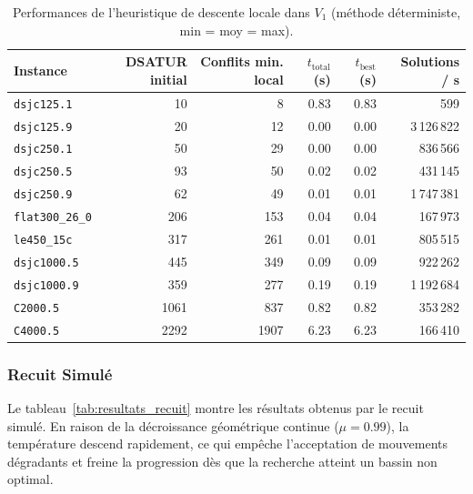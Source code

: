 \documentclass{article}
\begin{document}
\begin{table}[H]
\centering
\small
\setlength{\tabcolsep}{5pt}
\begin{tabular}{lrrrrr}
\toprule
\textbf{Instance} & \textbf{DSATUR initial} & \textbf{Conflits min. local} & \textbf{$t_{\text{total}}$ (s)} & \textbf{$t_{\text{best}}$ (s)} & \textbf{Solutions / s} \\
\midrule
\texttt{dsjc125.1}      & 10   & 8    & 0.83 & 0.83 & 599 \\
\texttt{dsjc125.9}      & 20   & 12   & 0.00 & 0.00 & 3\,126\,822 \\
\texttt{dsjc250.1}      & 50   & 29   & 0.00 & 0.00 & 836\,566 \\
\texttt{dsjc250.5}      & 93   & 50   & 0.02 & 0.02 & 431\,145 \\
\texttt{dsjc250.9}      & 62   & 49   & 0.01 & 0.01 & 1\,747\,381 \\
\texttt{flat300\_26\_0} & 206  & 153  & 0.04 & 0.04 & 167\,973 \\
\texttt{le450\_15c}     & 317  & 261  & 0.01 & 0.01 & 805\,515 \\
\texttt{dsjc1000.5}     & 445  & 349  & 0.09 & 0.09 & 922\,262 \\
\texttt{dsjc1000.9}     & 359  & 277  & 0.19 & 0.19 & 1\,192\,684 \\
\texttt{C2000.5}        & 1061 & 837  & 0.82 & 0.82 & 353\,282 \\
\texttt{C4000.5}        & 2292 & 1907 & 6.23 & 6.23 & 166\,410 \\
\bottomrule
\end{tabular}
\caption{Performances de l'heuristique de descente locale dans $V_1$ (méthode déterministe, min = moy = max).}
\label{tab:resultats_descente}
\end{table}

\subsubsection{Recuit Simulé}
Le tableau~\ref{tab:resultats_recuit} montre les résultats obtenus par le recuit simulé. En raison de la décroissance géométrique continue ($\mu = 0.99$), la température descend rapidement, ce qui empêche l'acceptation de mouvements dégradants et freine la progression dès que la recherche atteint un bassin non optimal.
\end{document}
